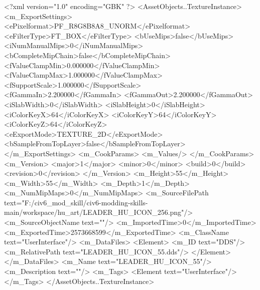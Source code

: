 <?xml version="1.0" encoding="GBK" ?>
<AssetObjects..TextureInstance>
	<m_ExportSettings>
		<ePixelformat>PF_R8G8B8A8_UNORM</ePixelformat>
		<eFilterType>FT_BOX</eFilterType>
		<bUseMips>false</bUseMips>
		<iNumManualMips>0</iNumManualMips>
		<bCompleteMipChain>false</bCompleteMipChain>
		<fValueClampMin>0.000000</fValueClampMin>
		<fValueClampMax>1.000000</fValueClampMax>
		<fSupportScale>1.000000</fSupportScale>
		<fGammaIn>2.200000</fGammaIn>
		<fGammaOut>2.200000</fGammaOut>
		<iSlabWidth>0</iSlabWidth>
		<iSlabHeight>0</iSlabHeight>
		<iColorKeyX>64</iColorKeyX>
		<iColorKeyY>64</iColorKeyY>
		<iColorKeyZ>64</iColorKeyZ>
		<eExportMode>TEXTURE_2D</eExportMode>
		<bSampleFromTopLayer>false</bSampleFromTopLayer>
	</m_ExportSettings>
	<m_CookParams>
		<m_Values/>
	</m_CookParams>
	<m_Version>
		<major>1</major>
		<minor>0</minor>
		<build>0</build>
		<revision>0</revision>
	</m_Version>
	<m_Height>55</m_Height>
	<m_Width>55</m_Width>
	<m_Depth>1</m_Depth>
	<m_NumMipMaps>0</m_NumMipMaps>
	<m_SourceFilePath text="F:/civ6_mod_skill/civ6-modding-skills-main/workspace/hu_art/LEADER_HU_ICON_256.png"/>
	<m_SourceObjectName text=""/>
	<m_ImportedTime>0</m_ImportedTime>
	<m_ExportedTime>2573668599</m_ExportedTime>
	<m_ClassName text="UserInterface"/>
	<m_DataFiles>
		<Element>
			<m_ID text="DDS"/>
			<m_RelativePath text="LEADER_HU_ICON_55.dds"/>
		</Element>
	</m_DataFiles>
	<m_Name text="LEADER_HU_ICON_55"/>
	<m_Description text=""/>
	<m_Tags>
		<Element text="UserInterface"/>
	</m_Tags>
</AssetObjects..TextureInstance>
